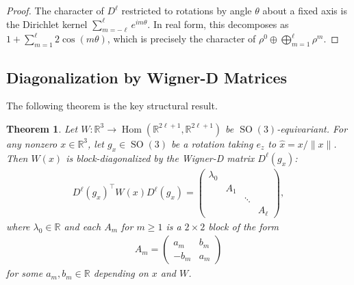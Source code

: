 \documentclass[a4paper, 12pt]{article}
\newcommand{\Hom}{\operatorname{Hom}}
\newcommand{\R}{\mathbb{R}}
\newcommand{\SO}{\operatorname{SO}(3)}
\newtheorem{theorem}{Theorem}[section]
\theoremstyle{definition}
\begin{document}
\begin{proof}
The character of $D^{\ell}$ restricted to rotations by angle $\theta$ about a fixed axis is the Dirichlet kernel $\sum_{m=-\ell}^{\ell} e^{im\theta}$. In real form, this decomposes as $1 + \sum_{m=1}^{\ell} 2\cos(m\theta)$, which is precisely the character of $\rho^0 \oplus \bigoplus_{m=1}^{\ell} \rho^m$.
\end{proof}


\subsection{Diagonalization by Wigner-D Matrices}

The following theorem is the key structural result.

\begin{theorem}\label{thm:main}
Let $W : \mathbb{R}^3 \to \Hom(\mathbb{R}^{2\ell + 1}, \mathbb{R}^{2\ell + 1})$ be $\SO$-equivariant. For any nonzero $x \in \mathbb{R}^3$, let $g_x \in \SO$ be a rotation taking $e_z$ to $\hat{x} = x/\|x\|$. Then $W(x)$ is block-diagonalized by the Wigner-D matrix $D^{\ell}(g_x)$:
\begin{align}
	D^{\ell}(g_x)^{\top} W(x) D^{\ell}(g_x) = \begin{pmatrix} \lambda_0 & & & \\ & A_1 & & \\ & & \ddots & \\ & & & A_{\ell} \end{pmatrix},
\end{align}
where $\lambda_0 \in \R$ and each $A_m$ for $m \geq 1$ is a $2 \times 2$ block of the form
\begin{align}
	A_m = \begin{pmatrix} a_m & b_m \\ -b_m & a_m \end{pmatrix}
\end{align}
for some $a_m, b_m \in \R$ depending on $x$ and $W$.
\end{theorem}
\end{document}
